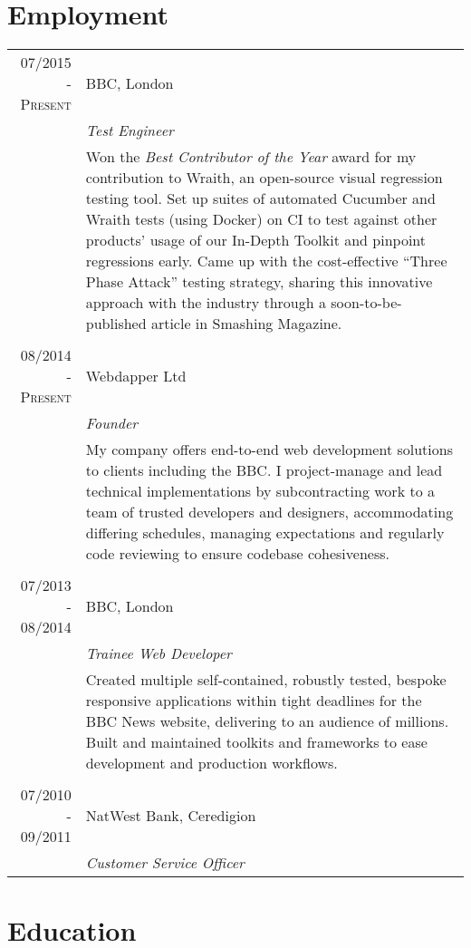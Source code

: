 \documentclass[class=article, crop=false]{standalone}
\begin{document}
\section{Employment}
\begin{tabular}{r|p{11cm}}
\textsc{07/2015 - Present} & BBC, London
\\&\emph{Test Engineer}
\\&\footnotesize{
Won the \emph{Best Contributor of the Year} award for my contribution to Wraith, an open-source visual regression testing tool. Set up suites of automated Cucumber and Wraith tests (using Docker) on CI to test against other products' usage of our In-Depth Toolkit and pinpoint regressions early. Came up with the cost-effective ``Three Phase Attack'' testing strategy, sharing this innovative approach with the industry through a soon-to-be-published article in Smashing Magazine.
}
\\\multicolumn{2}{c}{} \\
\textsc{08/2014 - Present} & Webdapper Ltd
\\&\emph{Founder}
\\&\footnotesize{My company offers end-to-end web development solutions to clients including the BBC. I project-manage and lead technical implementations by subcontracting work to a team of trusted developers and designers, accommodating differing schedules, managing expectations and regularly code reviewing to ensure codebase cohesiveness.}
\\\multicolumn{2}{c}{} \\
\textsc{07/2013 - 08/2014} & BBC, London
\\&\emph{Trainee Web Developer}
\\&\footnotesize{Created multiple self-contained, robustly tested, bespoke responsive applications within tight deadlines for the BBC News website, delivering to an audience of millions. Built and maintained toolkits and frameworks to ease development and production workflows.}
\\\multicolumn{2}{c}{} \\
\textsc{07/2010 - 09/2011} & NatWest Bank, Ceredigion
\\&\emph{Customer Service Officer}
\end{tabular}

\section{Education}
\end{document}
